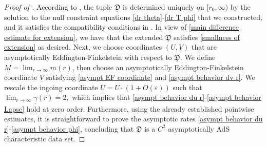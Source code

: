 \documentclass[11pt]{article}
\numberwithin{equation}{section}
\begin{document}
\begin{proof}[Proof of ]
According to , the tuple $\underline{\mathfrak{D}}$ is determined uniquely on $[r_0,\infty)$ by the solution to the null constraint equations \eqref{dr theta}-\eqref{dr T phi} that we constructed, and it satisfies the compatibility conditions in . In view of \eqref{main difference estimate for extension}, we have that the extended $\underline{\mathfrak{D}}$ satisfies \eqref{smallness of extension} as desired. Next, we choose coordinates $(\underline{U},\underline{V})$ that are asymptotically Eddington-Finkelstein with respect to $\underline{\mathfrak{D}}$. We define $\underline{M}=\lim_{r\rightarrow\infty}\underline{m}(r)$, then choose an asymptotically Eddington-Finkelstein coordinate $\underline{V}$ satisfying \eqref{asympt EF coordinate} and \eqref{asympt behavior dv r}. We rescale the ingoing coordinate $\underline{U}=U\cdot(1+O(\varepsilon))$ such that $\lim_{r\rightarrow\infty}\underline{\gamma}(r)=2,$ which implies that \eqref{asympt behavior du r}-\eqref{asympt behavior Lapse} hold at zero order. Furthermore, using the already established pointwise estimates, it is straightforward to prove the asymptotic rates \eqref{asympt behavior du r}-\eqref{asympt behavior phi}, concluding that $\underline{\mathfrak{D}}$ is a $C^2$ asymptotically AdS characteristic data set.
\end{proof}

\end{document}
